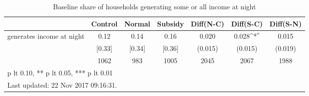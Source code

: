 \begin{table}[htbp]\centering
\def\sym#1{\ifmmode^{#1}\else\(^{#1}\)\fi}
\caption{Baseline share of households generating some or all income at night \label{tab:"balance"}}
\begin{tabular*}{1\hsize}{@{\hskip\tabcolsep\extracolsep\fill}l*{1}{cccccc}}
\toprule
                                &  Control&   Normal&  Subsidy&Diff(N-C)         &Diff(S-C)         &Diff(S-N)         \\
\midrule
generates income at night       &     0.12&     0.14&     0.16&    0.020         &    0.028\sym{*}  &    0.015         \\
                                &   [0.33]&   [0.34]&   [0.36]&  (0.015)         &  (0.015)         &  (0.019)         \\
                                &     1062&      983&     1005&     2045         &     2067         &     1988         \\
\bottomrule
\multicolumn{7}{l}{\footnotesize * p lt 0.10, ** p lt 0.05, *** p lt 0.01}\\
\multicolumn{7}{l}{\footnotesize Last updated: 22 Nov 2017 09:16:31.}\\
\end{tabular*}
\end{table}

